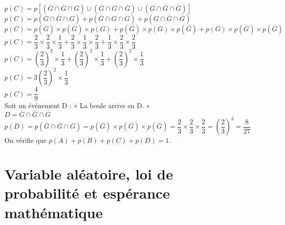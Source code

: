 $ p\left(C\right) = p\left[\left( \overline{G} \cap  \overline{G} \cap G \right) \cup \left( \overline{G} \cap G \cap \overline{G} \right) \cup \left( G \cap \overline{G} \cap \overline{G} \right)\right] $ \\

$ p\left(C\right) = p\left(\overline{G} \cap  \overline{G} \cap G \right) + p\left( \overline{G} \cap G \cap \overline{G} \right) + p\left( G \cap \overline{G} \cap \overline{G} \right) $ \\

$ p\left(C\right) = p\left(\overline{G}\right) \times p\left(\overline{G}\right) \times p\left(G\right) + p\left(\overline{G}\right) \times p\left(G\right) \times p\left(\overline{G}\right) + p\left(G\right) \times p\left(\overline{G}\right) \times p\left(\overline{G}\right) $ \\

$ p\left(C\right) = \dfrac{2}{3} \times \dfrac{2}{3} \times \dfrac{1}{3} +  \dfrac{2}{3} \times \dfrac{1}{3} \times \dfrac{2}{3} +  \dfrac{1}{3} \times \dfrac{2}{3} \times \dfrac{2}{3} $ \\

$ p\left(C\right) = \left(\dfrac{2}{3}\right)^2 \times \dfrac{1}{3} +  \left(\dfrac{2}{3}\right)^2 \times \dfrac{1}{3} +  \left(\dfrac{2}{3}\right)^2 \times \dfrac{1}{3} $ \\

$ p\left(C\right) = 3\left(\dfrac{2}{3}\right)^2 \times \dfrac{1}{3} $ \\

$ p\left(C\right) = \dfrac{4}{9} $ \\

Soit un événement D : « La boule arrive en D. » \\

$ D = \overline{G} \cap \overline{G} \cap \overline{G} $ \\

$ p\left(D\right) = p\left(\overline{G} \cap \overline{G} \cap \overline{G}\right) = p\left(\overline{G}\right) \times p\left(\overline{G}\right) \times p\left(\overline{G}\right) = \dfrac{2}{3} \times \dfrac{2}{3} \times \dfrac{2}{3} = \left(\dfrac{2}{3}\right)^3 = \dfrac{8}{27} $ \\

On vérifie que $p\left(A\right) + p\left(B\right) + p\left(C\right) + p\left(D\right) = 1$.

\newpage

\section{Variable aléatoire, loi de probabilité et espérance mathématique}

